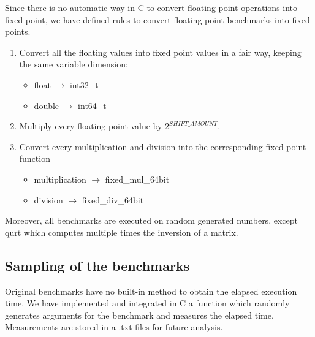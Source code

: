 Since there is no automatic way in C to convert floating point operations into fixed point, we have defined rules to convert floating point benchmarks into fixed points.
\begin{enumerate}
	\item Convert all the floating values into fixed point values in a fair way, keeping the same variable dimension:
	\begin{itemize}
		\item float $\rightarrow$ int32\_t	
		\item double $\rightarrow$ int64\_t
	\end{itemize}
	\item Multiply every floating point value by ${2}^{SHIFT\_AMOUNT}$.
	\item Convert every multiplication and division into the corresponding fixed point function
	\begin{itemize}
		\item multiplication $\rightarrow$ fixed\_mul\_64bit	
		\item division $\rightarrow$ fixed\_div\_64bit
	\end{itemize}
\end{enumerate}

Moreover, all benchmarks are executed on random generated numbers, except qurt which computes multiple times the inversion of a matrix. 
\subsection{Sampling of the benchmarks}

Original benchmarks have no built-in method to obtain the elapsed execution time. We have implemented and integrated in C a function which randomly generates arguments for the benchmark and measures the elapsed time.
Measurements are stored in a .txt files for future analysis.

